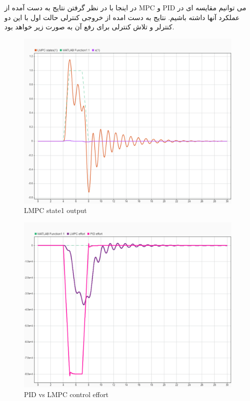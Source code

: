 در اینجا با در نظر گرفتن نتایج به دست آمده از MPC و PID می توانیم مقایسه ای در عملکرد آنها داشته باشیم.
نتایج به دست امده از خروجی کنترلی حالت اول با این دو کنترلر و تلاش کنترلی برای رفع آن به صورت زیر خواهد بود.

\begin{figure}[H]
	\centering
	\includegraphics[width=1\linewidth]{../img/13}
	\caption{LMPC state1 output}
	\label{fig:13}
\end{figure}

\begin{figure}[H]
	\centering
	\includegraphics[width=1\linewidth]{../img/14}
	\caption{PID vs LMPC control effort}
	\label{fig:14}
\end{figure}

